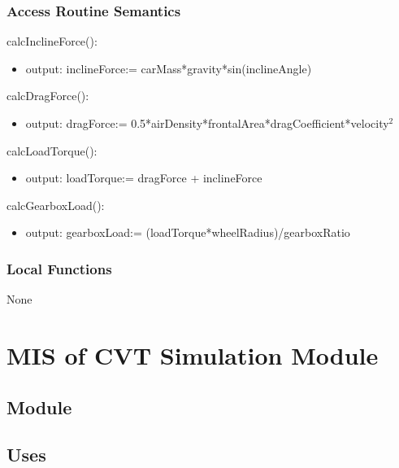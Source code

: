 \documentclass[12pt, titlepage]{article}
\begin{document}
\subsubsection{Access Routine Semantics}

\noindent calcInclineForce():
\begin{itemize}
\item output: inclineForce:= carMass*gravity*sin(inclineAngle)
\end{itemize}

\noindent calcDragForce():
\begin{itemize}
\item output: dragForce:= 0.5*airDensity*frontalArea*dragCoefficient*velocity$^2$
\end{itemize}

\noindent calcLoadTorque():
\begin{itemize}
\item output: loadTorque:= dragForce + inclineForce
\end{itemize}

\noindent calcGearboxLoad():
\begin{itemize}
\item output: gearboxLoad:= (loadTorque*wheelRadius)/gearboxRatio 
\end{itemize}

\subsubsection{Local Functions}

None

\newpage

\section{MIS of CVT Simulation Module} \label{Module_cvt_simulation} 



\subsection{Module}


\subsection{Uses}
\end{document}
